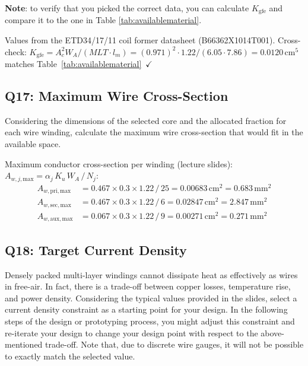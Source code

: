 \documentclass{PELsmallreport}
\begin{document}
\textbf{Note}: to verify that you picked the correct data, you can calculate $K_\mathrm{gfe}$ and compare it to the one in Table \ref{tab:availablematerial}. 


  \qquad  {}\hfill{}

\noindent Values from the ETD34/17/11 coil former datasheet (B66362X1014T001). Cross-check: $K_\mathrm{gfe} = A_c^2 W_A / (MLT \cdot l_m) = (0.971)^2 \cdot 1.22 / (6.05 \cdot 7.86) = 0.0120\,\mathrm{cm}^5$ matches Table~\ref{tab:availablematerial}~$\checkmark$







\subsection{Q17: Maximum Wire Cross-Section}
Considering the dimensions of the selected core and the allocated fraction for each wire winding, calculate the maximum wire cross-section that would fit in the available space. 

\begin{framed}
Maximum conductor cross-section per winding (lecture slides): $A_{w,j,\mathrm{max}} = \alpha_j\,K_u\,W_A\,/\,N_j$:
\begin{align}
    A_{w,\mathrm{pri,max}} &= 0.467\times0.3\times1.22\,/\,25 = 0.00683\,\mathrm{cm}^2 = 0.683\,\mathrm{mm}^2\\
    A_{w,\mathrm{sec,max}} &= 0.467\times0.3\times1.22\,/\,6 = 0.02847\,\mathrm{cm}^2 = 2.847\,\mathrm{mm}^2\\
    A_{w,\mathrm{aux,max}} &= 0.067\times0.3\times1.22\,/\,9 = 0.00271\,\mathrm{cm}^2 = 0.271\,\mathrm{mm}^2
\end{align}
\end{framed}

 \quad {} \quad {} \hfill{}





\subsection{Q18: Target Current Density} 
Densely packed multi-layer windings cannot dissipate heat as effectively as wires in free-air. 
In fact, there is a trade-off between copper losses, temperature rise, and power density. 
Considering the typical values provided in the slides, select a current density constraint as a starting point for your design. 
In the following steps of the design or prototyping process, you might adjust this constraint and re-iterate your design to change your design point with respect to the above-mentioned trade-off. 
Note that, due to discrete wire gauges, it will not be possible to exactly match the selected value. \\
\end{document}
